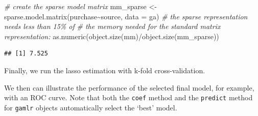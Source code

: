 \documentclass[
  12pt,
]{style/krantz}
\newenvironment{Shaded}{\begin{snugshade}}{\end{snugshade}}
\newcommand{\AttributeTok}[1]{\textcolor[rgb]{0.77,0.63,0.00}{#1}}
\newcommand{\CommentTok}[1]{\textcolor[rgb]{0.56,0.35,0.01}{\textit{#1}}}
\newcommand{\ConstantTok}[1]{\textcolor[rgb]{0.00,0.00,0.00}{#1}}
\newcommand{\FunctionTok}[1]{\textcolor[rgb]{0.00,0.00,0.00}{#1}}
\newcommand{\NormalTok}[1]{#1}
\newcommand{\OtherTok}[1]{\textcolor[rgb]{0.56,0.35,0.01}{#1}}
\newcommand{\SpecialCharTok}[1]{\textcolor[rgb]{0.00,0.00,0.00}{#1}}
\newcommand{\StringTok}[1]{\textcolor[rgb]{0.31,0.60,0.02}{#1}}
\begin{document}
\begin{Shaded}
\begin{Highlighting}[]
\CommentTok{\# create the sparse model matrix}
\NormalTok{mm\_sparse }\OtherTok{\textless{}{-}} \FunctionTok{sparse.model.matrix}\NormalTok{(purchase}\SpecialCharTok{\textasciitilde{}}\NormalTok{source, }\AttributeTok{data =}\NormalTok{ ga)}
\CommentTok{\# the sparse representation needs less than 15\% of }
\CommentTok{\# the memory needed for the standard matrix representation:}
\FunctionTok{as.numeric}\NormalTok{(}\FunctionTok{object.size}\NormalTok{(mm)}\SpecialCharTok{/}\FunctionTok{object.size}\NormalTok{(mm\_sparse))}
\end{Highlighting}
\end{Shaded}

\begin{verbatim}
## [1] 7.525
\end{verbatim}

Finally, we run the lasso estimation with k-fold cross-validation.

\begin{Shaded}
\end{Shaded}

We then can illustrate the performance of the selected final model, for example, with an ROC curve. Note that both the \texttt{coef} method and the \texttt{predict} method for \texttt{gamlr} objects automatically select the `best' model.

\begin{Shaded}
\end{Shaded}
\end{document}

